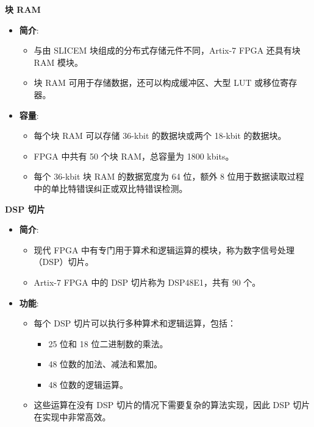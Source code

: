 \begin{frame}{\textbf{块 RAM}}
\label{ux5757-ram}
\begin{itemize}
\tightlist
\item
    \textbf{简介}:

    \begin{itemize}
    \tightlist
    \item
    与由 SLICEM 块组成的分布式存储元件不同，Artix-7 FPGA 还具有块 RAM
    模块。
    \item
    块 RAM 可用于存储数据，还可以构成缓冲区、大型 LUT 或移位寄存器。
    \end{itemize}
\item
    \textbf{容量}:

    \begin{itemize}
    \tightlist
    \item
    每个块 RAM 可以存储 36-kbit 的数据块或两个 18-kbit 的数据块。
    \item
    FPGA 中共有 50 个块 RAM，总容量为 1800 kbits。
    \item
    每个 36-kbit 块 RAM 的数据宽度为 64 位，额外 8
    位用于数据读取过程中的单比特错误纠正或双比特错误检测。
    \end{itemize}
\end{itemize}
\end{frame}

\begin{frame}{\textbf{DSP 切片}}
\label{dsp-ux5207ux7247}
\begin{itemize}
\tightlist
\item
    \textbf{简介}:

    \begin{itemize}
    \tightlist
    \item
    现代 FPGA
    中有专门用于算术和逻辑运算的模块，称为数字信号处理（DSP）切片。
    \item
    Artix-7 FPGA 中的 DSP 切片称为 DSP48E1，共有 90 个。
    \end{itemize}
\item
    \textbf{功能}:

    \begin{itemize}
    \tightlist
    \item
    每个 DSP 切片可以执行多种算术和逻辑运算，包括：

    \begin{itemize}
    \tightlist
    \item
        25 位和 18 位二进制数的乘法。
    \item
        48 位数的加法、减法和累加。
    \item
        48 位数的逻辑运算。
    \end{itemize}
    \item
    这些运算在没有 DSP 切片的情况下需要复杂的算法实现，因此 DSP
    切片在实现中非常高效。
    \end{itemize}
\end{itemize}
\end{frame}

